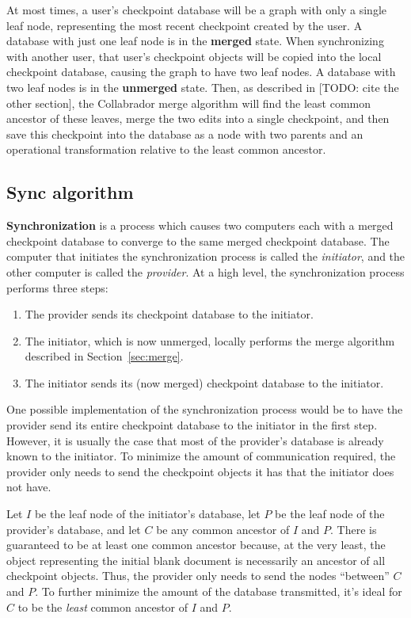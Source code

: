 \documentclass[11pt,titlepage]{article}
\begin{document}
At most times, a user's checkpoint database will be a graph with only
a single leaf node, representing the most recent checkpoint created by
the user. A database with just one leaf node is in the \textbf{merged}
state. When synchronizing with another user, that user's checkpoint
objects will be copied into the local checkpoint database, causing the
graph to have two leaf nodes. A database with two leaf nodes is in the
\textbf{unmerged} state. Then, as described in [TODO: cite the other
section], the Collabrador merge algorithm will find the least common
ancestor of these leaves, merge the two edits into a single
checkpoint, and then save this checkpoint into the database as a node
with two parents and an operational transformation relative to the
least common ancestor.

\subsection{Sync algorithm}

\textbf{Synchronization} is a process which causes two computers each
with a merged checkpoint database to converge to the same merged
checkpoint database. The computer that initiates the synchronization
process is called the \emph{initiator}, and the other computer is
called the \emph{provider}. At a high level, the synchronization
process performs three steps:
\begin{enumerate}
\item The provider sends its checkpoint database to the initiator.
\item The initiator, which is now unmerged, locally performs the merge
  algorithm described in Section~\ref{sec:merge}.
\item The initiator sends its (now merged) checkpoint database to the
  initiator.
\end{enumerate}
One possible implementation of the synchronization process would be to
have the provider send its entire checkpoint database to the initiator
in the first step. However, it is usually the case that most of the
provider's database is already known to the initiator. To minimize the
amount of communication required, the provider only needs to send the
checkpoint objects it has that the initiator does not have.

Let $I$ be the leaf node of the initiator's database, let $P$ be the
leaf node of the provider's database, and let $C$ be any common
ancestor of $I$ and $P$. There is guaranteed to be at least one common
ancestor because, at the very least, the object representing the
initial blank document is necessarily an ancestor of all checkpoint
objects. Thus, the provider only needs to send the nodes ``between''
$C$ and $P$. To further minimize the amount of the database
transmitted, it's ideal for $C$ to be the \emph{least} common ancestor
of $I$ and $P$.
\end{document}
